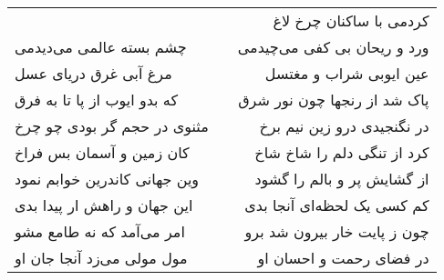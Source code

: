 \begin{center}
\begin{longtable}{l p{0.5cm} r}
&&
کردمی با ساکنان چرخ لاغ
\\
چشم بسته عالمی می‌دیدمی
&&
ورد و ریحان بی کفی می‌چیدمی
\\
مرغ آبی غرق دریای عسل
&&
عین ایوبی شراب و مغتسل
\\
که بدو ایوب از پا تا به فرق
&&
پاک شد از رنجها چون نور شرق
\\
مثنوی در حجم گر بودی چو چرخ
&&
در نگنجیدی درو زین نیم برخ
\\
کان زمین و آسمان بس فراخ
&&
کرد از تنگی دلم را شاخ شاخ
\\
وین جهانی کاندرین خوابم نمود
&&
از گشایش پر و بالم را گشود
\\
این جهان و راهش ار پیدا بدی
&&
کم کسی یک لحظه‌ای آنجا بدی
\\
امر می‌آمد که نه طامع مشو
&&
چون ز پایت خار بیرون شد برو
\\
مول مولی می‌زد آنجا جان او
&&
در فضای رحمت و احسان او
\\
\end{longtable}
\end{center}
